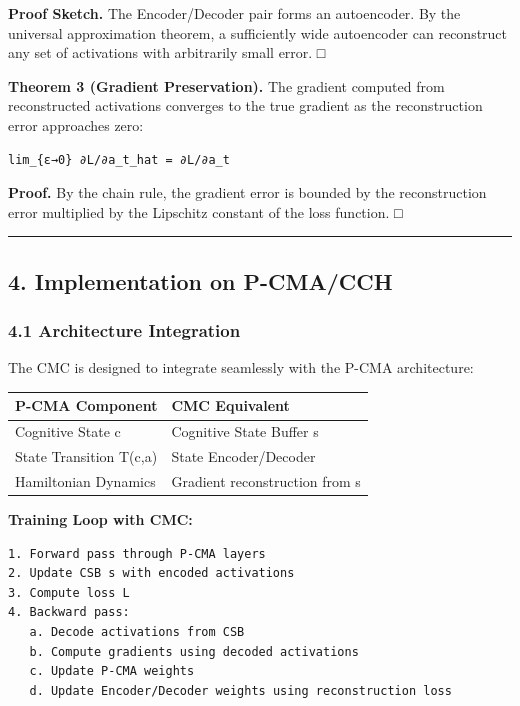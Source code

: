 \documentclass[
  11pt,
  a4paper,
]{article}
\begin{document}
\textbf{Proof Sketch.} The Encoder/Decoder pair forms an autoencoder. By
the universal approximation theorem, a sufficiently wide autoencoder can
reconstruct any set of activations with arbitrarily small error. □

\textbf{Theorem 3 (Gradient Preservation).} The gradient computed from
reconstructed activations converges to the true gradient as the
reconstruction error approaches zero:

\begin{verbatim}
lim_{ε→0} ∂L/∂a_t_hat = ∂L/∂a_t
\end{verbatim}

\textbf{Proof.} By the chain rule, the gradient error is bounded by the
reconstruction error multiplied by the Lipschitz constant of the loss
function. □

\begin{center}\rule{0.5\linewidth}{0.5pt}\end{center}

\subsection{4. Implementation on
P-CMA/CCH}\label{implementation-on-p-cmacch}

\subsubsection{4.1 Architecture
Integration}\label{architecture-integration}

The CMC is designed to integrate seamlessly with the P-CMA architecture:

\begin{longtable}[]{@{}ll@{}}
\toprule\noalign{}
P-CMA Component & CMC Equivalent \\
\midrule\noalign{}
\endhead
\bottomrule\noalign{}
\endlastfoot
Cognitive State c & Cognitive State Buffer s \\
State Transition T(c,a) & State Encoder/Decoder \\
Hamiltonian Dynamics & Gradient reconstruction from s \\
\end{longtable}

\textbf{Training Loop with CMC:}

\begin{verbatim}
1. Forward pass through P-CMA layers
2. Update CSB s with encoded activations
3. Compute loss L
4. Backward pass:
   a. Decode activations from CSB
   b. Compute gradients using decoded activations
   c. Update P-CMA weights
   d. Update Encoder/Decoder weights using reconstruction loss
\end{verbatim}
\end{document}
